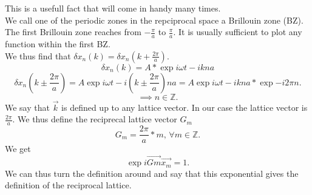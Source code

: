 \documentclass{report}
\begin{document}
This is a usefull fact that will come in handy many times.\\
We call one of the periodic zones in the repciprocal space a Brillouin zone (BZ). The first Brillouin zone reaches from $-\frac{\pi}{a}$ to $\frac{\pi}{a}$. It is usually sufficient to plot any function within the first BZ.\\
We thus find that $\delta x_n(k) = \delta x_n(k+\frac{2 \pi}{a}) $. \[
	\delta x_n(k) = A * \exp{i\omega t - i k na}
\] \[
\delta x_n(k \pm \frac{2\pi}{a}) = A \exp{i \omega t - i \left( k \pm \frac{2 \pi}{a} \right) n a} = A \exp{i\omega t - i kna} * \exp{-i 2 \pi n}
.\] \[
\implies n \in \mathbb{Z}
.\]  We say that $\vec{k}$ is defined up to any lattice vector. In our case the lattice vector is $\frac{2\pi}{a}$. We thus define the reciprecal lattice vector $G_m$ \[
G_m = \frac{2\pi}{a}*m \text{, } \forall m \in \mathbb{Z}
.\] We get \[
\exp{i \vec{Gm} \vec{x_m}} = 1
.\] We can thus turn the definition around and say that this exponential gives the definition of the reciprocal lattice. 
\end{document}
